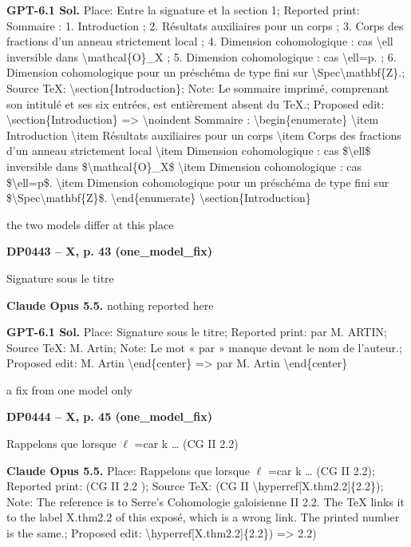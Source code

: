 \textbf{GPT-6.1 Sol.} Place: Entre la signature et la section 1; Reported print: Sommaire : 1. Introduction ; 2. Résultats auxiliaires pour un corps ; 3. Corps des fractions d'un anneau strictement local ; 4. Dimension cohomologique : cas \textbackslash{}ell inversible dans \textbackslash{}mathcal\{O\}\_X ; 5. Dimension cohomologique : cas \textbackslash{}ell=\allowbreak p. ; 6. Dimension cohomologique pour un préschéma de type fini sur \textbackslash{}Spec\textbackslash{}mathbf\{Z\}.; Source TeX: \textbackslash{}section\{Introduction\}; Note: Le sommaire imprimé, comprenant son intitulé et ses six entrées, est entièrement absent du TeX.; Proposed edit: \textbackslash{}section\{Introduction\} =\allowbreak > \textbackslash{}noindent Sommaire : \textbackslash{}begin\{enumerate\} \textbackslash{}item Introduction \textbackslash{}item Résultats auxiliaires pour un corps \textbackslash{}item Corps des fractions d'un anneau strictement local \textbackslash{}item Dimension cohomologique : cas \$\textbackslash{}ell\$ inversible dans \$\textbackslash{}mathcal\{O\}\_X\$ \textbackslash{}item Dimension cohomologique : cas \$\textbackslash{}ell=\allowbreak p\$. \textbackslash{}item Dimension cohomologique pour un préschéma de type fini sur \$\textbackslash{}Spec\textbackslash{}mathbf\{Z\}\$. \textbackslash{}end\{enumerate\}  \textbackslash{}section\{Introduction\}\par
the two models differ at this place\par
\par\noindent\hypertarget{DP0443}{}\textbf{DP0443 -- X, p. 43 (one\_model\_fix)}\par
Signature sous le titre\par
\textbf{Claude Opus 5.5.} nothing reported here\par
\textbf{GPT-6.1 Sol.} Place: Signature sous le titre; Reported print: par M. ARTIN; Source TeX: M. Artin; Note: Le mot « par » manque devant le nom de l'auteur.; Proposed edit: M. Artin \textbackslash{}end\{center\} =\allowbreak > par M. Artin \textbackslash{}end\{center\}\par
a fix from one model only\par
\par\noindent\hypertarget{DP0444}{}\textbf{DP0444 -- X, p. 45 (one\_model\_fix)}\par
Rappelons que lorsque \ensuremath{\ell} =\allowbreak  car k … (CG II 2.2)\par
\textbf{Claude Opus 5.5.} Place: Rappelons que lorsque \ensuremath{\ell} =\allowbreak  car k … (CG II 2.2); Reported print: (CG II 2.2 ); Source TeX: (CG II \textbackslash{}hyperref[X.thm2.2]\{2.2\}); Note: The reference is to Serre's Cohomologie galoisienne II 2.2. The TeX links it to the label X.thm2.2 of this exposé, which is a wrong link. The printed number is the same.; Proposed edit: \textbackslash{}hyperref[X.thm2.2]\{2.2\}) =\allowbreak > 2.2)\par
